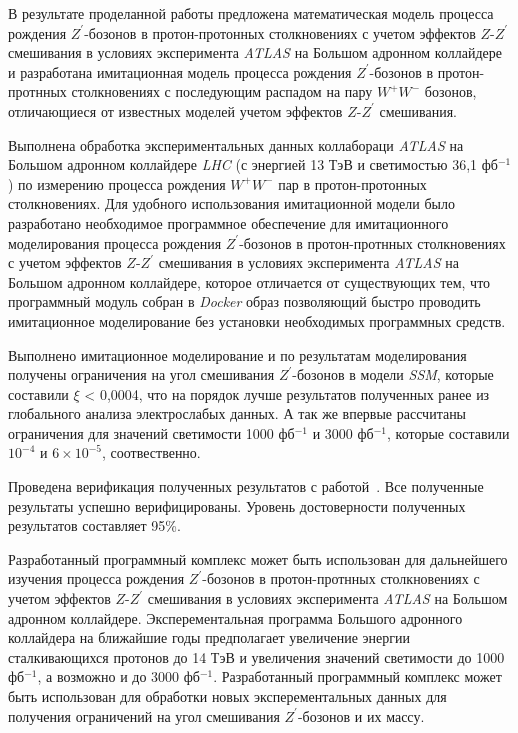 В результате проделанной работы предложена математическая
модель процесса
рождения ${Z}^{\prime}$-бозонов в протон-протонных столкновениях с учетом эффектов $Z$-${Z}^{\prime}$ смешивания в условиях эксперимента \textit{ATLAS} на Большом адронном коллайдере и разработана имитационная модель процесса рождения ${Z}^{\prime}$-бозонов в протон-протнных столкновениях с последующим распадом на пару ${W}^{+}{W}^{-}$ бозонов, отличающиеся от известных моделей учетом эффектов $Z$-${Z}^{\prime}$ смешивания.

Выполнена обработка экспериментальных данных коллабораци  \textit{ATLAS} на Большом адронном коллайдере \textit{LHC} (с энергией 13 ТэВ и светимостью 36,1 фб${}^{−1}$) по измерению процесса рождения ${W}^{+}$${W}^{-}$ пар в протон-протонных столкновениях.
Для удобного использования имитационной модели было разработано необходимое программное обеспечение для имитационного моделирования процесса
рождения ${Z}^{\prime}$-бозонов в протон-протнных столкновениях с учетом эффектов $Z$-${Z}^{\prime}$ смешивания в условиях эксперимента \textit{ATLAS} на Большом адронном коллайдере, которое отличается от существующих тем, что программный модуль собран в \textit{Docker} образ позволяющий быстро проводить имитационное моделирование без установки необходимых программных средств.

Выполнено имитационное моделирование и по результатам моделирования получены ограничения на угол смешивания ${Z}^{\prime}$-бозонов в модели \textit{SSM}, которые составили $\xi$ < 0,0004, что на порядок лучше результатов полученных ранее из глобального анализа электрослабых данных. А так же впервые рассчитаны ограничения для значений светимости 1000 фб${}^{−1}$ и 3000 фб${}^{−1}$, которые составили ${10}^{-4}$ и $6\times{10}^{-5}$, соотвественно.

Проведена верификация полученных результатов с
работой~\cite{2part-pankov}. Все полученные результаты успешно верифицированы. Уровень достоверности полученных результатов составляет 95\%.

Разработанный программный комплекс может быть использован для дальнейшего изучения процесса рождения ${Z}^{\prime}$-бозонов в протон-протнных столкновениях с учетом эффектов $Z$-${Z}^{\prime}$ смешивания в условиях эксперимента \textit{ATLAS} на Большом адронном коллайдере. Эксперементальная программа Большого адронного коллайдера на  ближайшие годы предполагает увеличение энергии сталкивающихся протонов до 14 ТэВ и увеличения значений светимости до 1000 фб${}^{−1}$, а возможно и до 3000 фб${}^{−1}$. Разработанный программный комплекс может быть использован для обработки новых эксперементальных данных для получения ограничений на угол смешивания ${Z}^{\prime}$-бозонов и их массу.